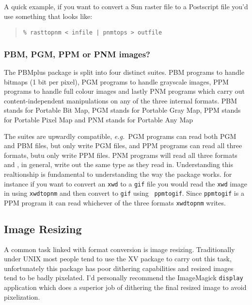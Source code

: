 \documentclass[twoside,11pt]{article}
\newcommand{\htmlref}[2]{#1}
\newcommand{\xlabel}[1]{}
\begin{document}
A quick example, if you want to convert a Sun raster file to a
Postscript file you'd use something that looks like:

\small
\begin{quote}
\begin{verbatim}
% rasttopnm < infile | pnmtops > outfile
\end{verbatim}
\end{quote}
\normalsize

\subsubsection{PBM, PGM, PPM or PNM images?}

The PBMplus package is split into four distinct suites. PBM programs
to handle bitmaps (1 bit per pixel), PGM programs to handle grayscale
images, PPM programs to handle full colour images and lastly PNM
programs which carry out content-independent manipulations on any of
the three internal formats. PBM stands for Portable Bit Map, PGM
stands for Portable Gray Map, PPM stands for Portable Pixel Map and PNM
stands for Portable Any Map

The suites are upwardly compatible, {\em e.g.\ }PGM programs can read
both PGM and PBM files, but only write PGM files, and PPM programs can
read all three formats, butu only write PPM files. PNM programs will
read all three formats and , in general, write out the same type as
they read in. Understanding this realtionship is fundamental to
understanding the way the package works. for instance if you want to
convert an {\tt xwd} to a {\tt gif} file you would read the {\tt xwd}
image in using {\tt xwdtopnm} and then convert to {\tt gif} using {\tt
ppmtogif}. Since {\tt ppmtogif} is a PPM program it can read whichever
of the three formats {\tt xwdtopnm} writes.

\subsection{\xlabel{sc15_resizing}Image Resizing\label{sc15_resizing}}

A common task linked with format conversion is image resizing.
Traditionally under UNIX most people tend to use the
\htmlref{XV}{sc15_xv} package to carry out this task, unfortunately
this package has poor dithering capabilities and resized images tend
to be badly pixelated. I'd personally recommend the
\htmlref{ImageMagick}{sc15_magick} {\tt display} application which
does a superior job of dithering the final resized image to avoid
pixelization.
\end{document}
